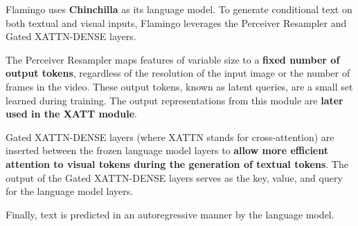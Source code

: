 Flamingo uses \textbf{Chinchilla} as its language model. To generate conditional text on both textual and visual inputs, Flamingo leverages the Perceiver Resampler and Gated XATTN-DENSE layers.





The Perceiver Resampler maps features of variable size to a \textbf{fixed number of output tokens}, regardless of the resolution of the input image or the number of frames in the video. These output tokens, known as latent queries, are a small set learned during training. The output representations from this module are \textbf{later used in the XATT module}.

Gated XATTN-DENSE layers (where XATTN stands for cross-attention) are inserted between the frozen language model layers to \textbf{allow more efficient attention to visual tokens during the generation of textual tokens}. The output of the Gated XATTN-DENSE layers serves as the key, value, and query for the language model layers.

Finally, text is predicted in an autoregressive manner by the language model. 
